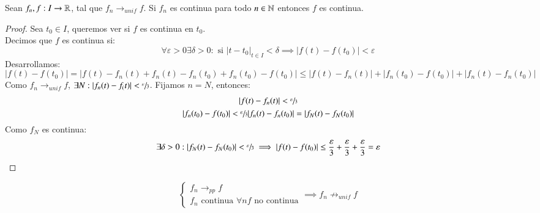 \begin{pro}
    Sean $f_n, f : I \to \mathbb{R}$, tal que $f_n \to_{unif} f$. Si $f_n$ es continua para todo $n \in \mathbb{N}$ entonces $f$ es continua.
\end{pro}
\begin{proof}
    Sea $t_0 \in I$, queremos ver si $f$ es continua en $t_0$.\\
    Decimos que $f$ es continua si:
    $$
        \forall \varepsilon > 0 \exists \delta > 0 : \text{ si } |t-t_0|_{t\in I} < \delta \implies |f(t)-f(t_0)| < \varepsilon
    $$
    Desarrollamos:
    $$
        |f(t) - f(t_0)| = |f(t) -f_n(t) + f_n(t) -f_n(t_0) + f_n(t_0) - f(t_0)| \leq |f(t) - f_n(t)| + |f_n(t_0) - f(t_0)| + |f_n(t) - f_n(t_0)|
    $$
    Como $f_n \to_{unif} f$, $\exists N : |f_n(t) - f_(t)| < \sfrac{\varepsilon}{3}$. Fijamos $n = N$, entonces:
    \begin{gather}
        |f(t) - f_n(t)| < \sfrac{\varepsilon}{3}\\
        |f_n(t_0) - f(t_0)| < \sfrac{\varepsilon}{3}
        |f_n(t) - f_n(t_0)| = |f_N(t) - f_N(t_0)|
    \end{gather}
    Como $f_N$ es continua:
    $$
        \exists \delta > 0 : |f_N(t) - f_N(t_0)| < \sfrac{\varepsilon}{3} \implies |f(t) - f(t_0)| \leq \frac{\varepsilon}{3}+\frac{\varepsilon}{3}+\frac{\varepsilon}{3} = \varepsilon
    $$
\end{proof}
\begin{cor}
    $$
        \begin{cases}
            f_n \to_{pp} f\\
            f_n \text{ continua } \forall n
            f \text{ no continua}
        \end{cases} \implies f_n \not\to_{unif} f
    $$
\end{cor}

